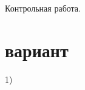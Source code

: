 \documentclass[a4paper]{article}
\begin{document}
    \begin{center} 
        \LARGE Контрольная работа.\\
    \end{center}
    
    \newpage
    \section{вариант}
    1)
\end{document}
